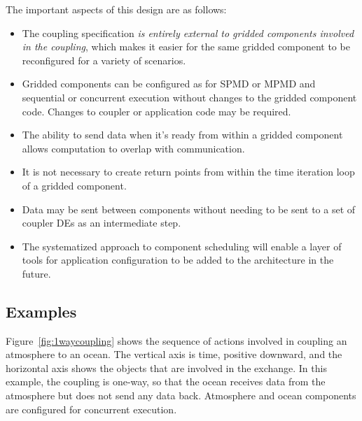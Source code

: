 The important aspects of this design are as follows:
\begin{itemize}
\item The coupling specification {\it is entirely external to gridded 
components involved in the coupling}, which makes it easier for the 
same gridded component to be reconfigured for a variety of scenarios.
\item Gridded components can be configured as for SPMD or MPMD and 
sequential or concurrent execution without changes to the gridded 
component code.  Changes to coupler or application code may be required. 
\item The ability to send data when it's ready from within a gridded
component allows computation to overlap with communication.  
\item It is not necessary to create return points from 
within the time iteration loop of a gridded component.  
\item Data may be sent between components without needing to 
be sent to a set of coupler DEs as an intermediate step.
\item The systematized approach to component scheduling will
enable a layer of tools for application configuration to be added to
the architecture in the future.
\end{itemize}

\subsection{Examples}

Figure~\ref{fig:1waycoupling} shows the sequence of actions involved
in coupling an atmosphere to an ocean.  The vertical axis is time, positive
downward, and the horizontal axis shows the objects that are involved in the
exchange.  In this example, the coupling is one-way, so that the ocean 
receives data from the atmosphere but does not send any data back.  Atmosphere
and ocean components are configured for concurrent execution.

